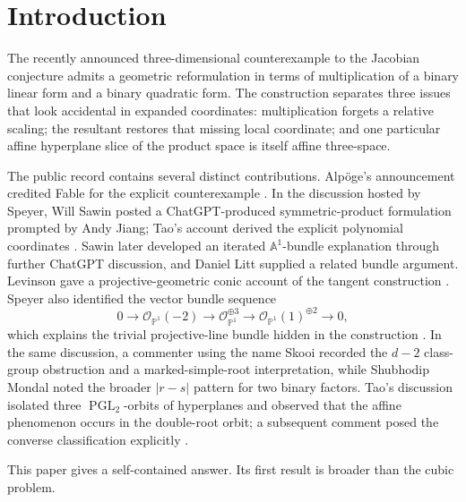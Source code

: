 \documentclass[11pt,reqno]{amsart}
\theoremstyle{definition}
\theoremstyle{remark}
\newcommand{\A}{\mathbb A}
\newcommand{\Pj}{\mathbb P}
\newcommand{\OO}{\mathcal O}
\newcommand{\abs}[1]{\lvert #1\rvert}
\begin{document}
\section{Introduction}

The recently announced three-dimensional counterexample to the Jacobian
conjecture admits a geometric reformulation in terms of multiplication of
a binary linear form and a binary quadratic form.  The construction
separates three issues that look accidental in expanded coordinates:
multiplication forgets a relative scaling; the resultant restores that
missing local coordinate; and one particular affine hyperplane slice of
the product space is itself affine three-space.

The public record contains several distinct contributions.  Alpöge's
announcement credited Fable for the explicit counterexample
\cite{AlpogeAnnouncement}.  In the discussion hosted by Speyer, Will
Sawin posted a ChatGPT-produced symmetric-product formulation prompted
by Andy Jiang; Tao's account derived the explicit polynomial coordinates
\cite{SpeyerThread,TaoDigestion}.  Sawin later developed an iterated
$\A^1$-bundle explanation through further ChatGPT discussion, and Daniel
Litt supplied a related bundle argument.  Levinson gave a
projective-geometric conic account of the tangent construction
\cite{SpeyerThread,LevinsonGeometry}.  Speyer also identified the vector
bundle sequence
\[
 0\longrightarrow\OO_{\Pj^1}(-2)
 \longrightarrow\OO_{\Pj^1}^{\oplus3}
 \longrightarrow\OO_{\Pj^1}(1)^{\oplus2}
 \longrightarrow0,
\]
which explains the trivial projective-line bundle hidden in the
construction \cite{SpeyerThread}.  In the same discussion, a commenter
using the name Skooi recorded the $d-2$ class-group obstruction and a
marked-simple-root interpretation, while Shubhodip Mondal noted the
broader $\abs{r-s}$ pattern for two binary factors.  Tao's discussion
isolated three $\operatorname{PGL}_2$-orbits of hyperplanes and observed
that the affine phenomenon occurs in the double-root orbit; a subsequent
comment posed the converse classification explicitly
\cite{SpeyerThread,TaoDigestion}.

This paper gives a self-contained answer.  Its first result is broader
than the cubic problem.
\end{document}
